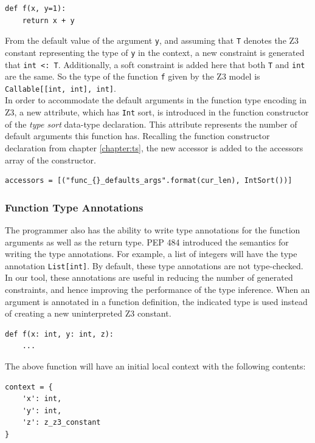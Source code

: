 \begin{lstlisting}
def f(x, y=1):
	return x + y
\end{lstlisting}

From the default value of the argument \lstinline|y|, and assuming that \lstinline|T| denotes the Z3 constant representing the type of \lstinline|y| in the context, a new constraint is generated that \lstinline|int <: T|. Additionally, a soft constraint is added here that both \lstinline|T| and \lstinline|int| are the same. So the type of the function \lstinline|f| given by the Z3 model is \lstinline|Callable[[int, int], int]|.\\

In order to accommodate the default arguments in the function type encoding in Z3, a new attribute, which has \lstinline|Int| sort, is introduced in the function constructor of the \textit{type sort} data-type declaration. This attribute represents the number of default arguments this function has. Recalling the function constructor declaration from chapter \ref{chapter:ts}, the new accessor is added to the accessors array of the constructor.
\begin{lstlisting}
accessors = [("func_{}_defaults_args".format(cur_len), IntSort())]
\end{lstlisting}

\subsubsection{Function Type Annotations}
The programmer also has the ability to write type annotations for the function arguments as well as the return type. PEP 484 \cite{484} introduced the semantics for writing the type annotations. For example, a list of integers will have the type annotation \lstinline|List[int]|. By default, these type annotations are not type-checked. In our tool, these annotations are useful in reducing the number of generated constraints, and hence improving the performance of the type inference. When an argument is annotated in a function definition, the indicated type is used instead of creating a new uninterpreted Z3 constant.
\begin{lstlisting}
def f(x: int, y: int, z):
	...
\end{lstlisting}
The above function will have an initial local context with the following contents:
\begin{lstlisting}
context = {
	'x': int,
	'y': int,
	'z': z_z3_constant
}
\end{lstlisting}

